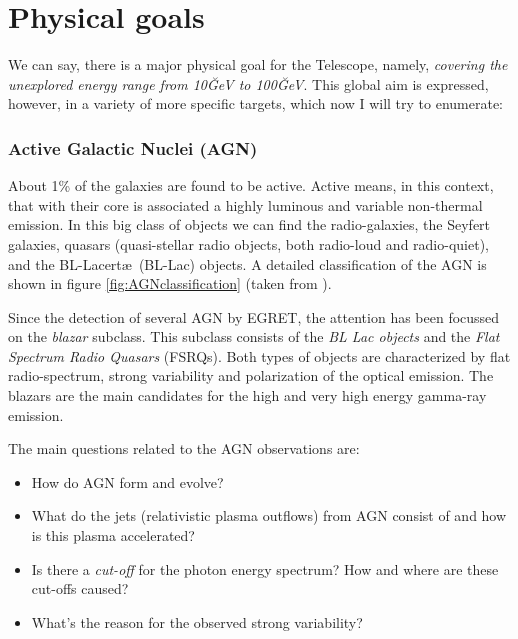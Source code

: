 \CGROenergiesfig

\section{Physical goals}
%
We can say, there is a major physical goal for the \MAGIC Telescope,
namely, \emph{covering the unexplored energy range from 10\u{GeV} to
  100\u{GeV}}. This global aim is expressed, however, in a variety of
more specific targets, which now I will try to enumerate:

\subsubsection*{Active Galactic Nuclei (AGN)} 
%
About 1\% of the galaxies are found to be active. Active means, in
this context, that with their core is associated a highly luminous and
variable non-thermal emission. In this big class of objects we can
find the radio-galaxies, the Seyfert galaxies, quasars (quasi-stellar
radio objects, both radio-loud and radio-quiet), and the BL-Lacert\ae\
(BL-Lac) objects. A detailed classification of the AGN is shown in
figure \ref{fig:AGNclassification} (taken from
\cite{Petry:tesis}).

\AGNclassificationfig

Since the detection of several AGN by EGRET, the attention has been
focussed on the \emph{blazar} subclass. This subclass consists of the
\emph{BL Lac objects} and the \emph{Flat Spectrum Radio Quasars}
(FSRQs). Both types of objects are characterized by flat
radio-spectrum, strong variability and polarization of the optical
emission. The blazars are the main candidates for the high and very
high energy gamma-ray emission.

The main questions related to the AGN observations are:
%
\begin{itemize}
\item How do AGN form and evolve?
\item What do the jets (relativistic plasma outflows) from AGN consist
of and how is this plasma accelerated?
\item Is there a \emph{cut-off} for the photon energy spectrum? How
  and where are these cut-offs caused?
\item What's the reason for the observed strong variability?
\end{itemize}

